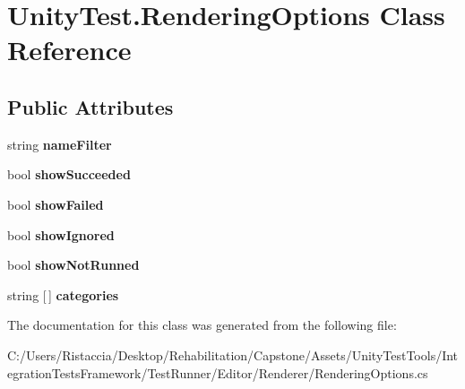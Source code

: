 \hypertarget{class_unity_test_1_1_rendering_options}{}\section{Unity\+Test.\+Rendering\+Options Class Reference}
\label{class_unity_test_1_1_rendering_options}
\subsection*{Public Attributes}
\begin{DoxyCompactItemize}
\item 
\mbox{\label{class_unity_test_1_1_rendering_options_a57a8b152674638c49c73d9d8372710f6}} 
string {\bfseries name\+Filter}
\item 
\mbox{\label{class_unity_test_1_1_rendering_options_addf47773d45d2892c9dcd98f31149d8a}} 
bool {\bfseries show\+Succeeded}
\item 
\mbox{\label{class_unity_test_1_1_rendering_options_a43f4d60ce8e38981f67f930253219211}} 
bool {\bfseries show\+Failed}
\item 
\mbox{\label{class_unity_test_1_1_rendering_options_a4c2659ac3944be2e7cf60ff457710bff}} 
bool {\bfseries show\+Ignored}
\item 
\mbox{\label{class_unity_test_1_1_rendering_options_a0e9b578c2a99de66db7d47f20806007f}} 
bool {\bfseries show\+Not\+Runned}
\item 
\mbox{\label{class_unity_test_1_1_rendering_options_a876d8e747c69e0e067da31d9fb3b96f7}} 
string \mbox{[}$\,$\mbox{]} {\bfseries categories}
\end{DoxyCompactItemize}


The documentation for this class was generated from the following file\+:\begin{DoxyCompactItemize}
\item 
C\+:/\+Users/\+Ristaccia/\+Desktop/\+Rehabilitation/\+Capstone/\+Assets/\+Unity\+Test\+Tools/\+Integration\+Tests\+Framework/\+Test\+Runner/\+Editor/\+Renderer/Rendering\+Options.\+cs\end{DoxyCompactItemize}
